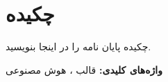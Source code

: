 
\thispagestyle{plain}


\section*{چکیده}
چکیده پایان نامه را در اینجا بنویسید.


\vskip 2cm
\noindent
\textbf{واژه‌های کلیدی:} 
قالب ، هوش مصنوعی

